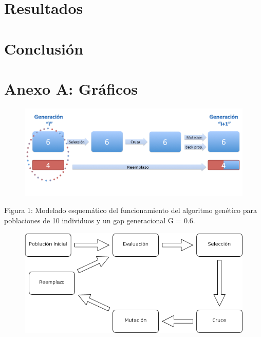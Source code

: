 \documentclass[%
    final,
    reprint,
    notitlepage,
    narroweqnarray,
    inline,
    twoside,
    invited
    ]{ieee}
\begin{document}
\section{Resultados}

\section{Conclusión}




\clearpage
\onecolumn

\section*{Anexo A: Gráficos}

\begin{figure}[H]
\begin{center}
\includegraphics[scale=1.90]{./images/AlgGenModelado.png}
\label{modelado}
\end{center}
\end{figure}

\begin{center}
\par Figura 1: Modelado esquemático del funcionamiento del algoritmo genético para poblaciones de 10 individuos y un gap generacional G = 0.6.
\end{center}

\begin{figure}[H]
\begin{center}
\includegraphics[scale=0.650]{./images/Dibujo1.png}
\label{modelado}
\end{center}
\end{figure}
\end{document}
